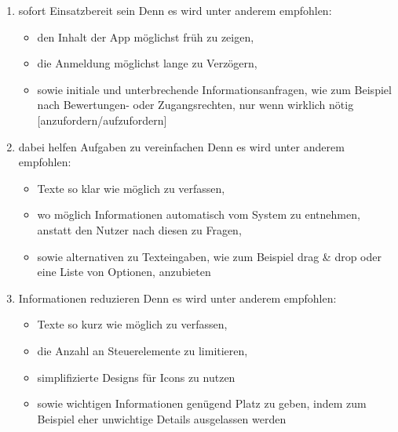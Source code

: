 \begin{enumerate}%
	\item sofort Einsatzbereit sein\newline%
		Denn es wird unter anderem empfohlen:%
	\begin{itemize}%
		\item den Inhalt der App möglichst früh zu zeigen\cite{konventionen_patterns_loading},%
		\item die Anmeldung möglichst lange zu Verzögern\cite{konventionen_patterns_managingAccounts},%
		\item sowie initiale und unterbrechende Informationsanfragen, wie zum Beispiel nach Bewertungen- oder Zugangsrechten, nur wenn wirklich nötig [anzufordern/aufzufordern]\cite{konventionen_patterns_launching}%
	\end{itemize}


	\item dabei helfen Aufgaben zu vereinfachen\newline%
		Denn es wird unter anderem empfohlen:%
	\begin{itemize}%
		\item Texte so klar wie möglich zu verfassen\cite{konventionen_foundations_writing},
		\item wo möglich Informationen automatisch vom System zu entnehmen, anstatt den Nutzer nach diesen zu Fragen\cite{konventionen_patterns_enteringData, konventionen_platforms_ios},
		\item sowie alternativen zu Texteingaben, wie zum Beispiel \glqq drag \& drop\grqq{} oder eine Liste von Optionen,  anzubieten\cite{konventionen_patterns_enteringData}
	\end{itemize}

	\item Informationen reduzieren\newline%
		Denn es wird unter anderem empfohlen:%
	\begin{itemize}%
		\item Texte so kurz wie möglich zu verfassen\cite{konventionen_foundations_writing},
		\item die Anzahl an Steuerelemente zu limitieren\cite{konventionen_platforms_ios},
		\item simplifizierte Designs für Icons zu nutzen\cite{konventionen_foundations_icons}
		\item sowie wichtigen Informationen genügend Platz zu geben, indem zum Beispiel eher unwichtige Details ausgelassen werden\cite{konventionen_foundations_layout}
	\end{itemize}	


\end{enumerate}
